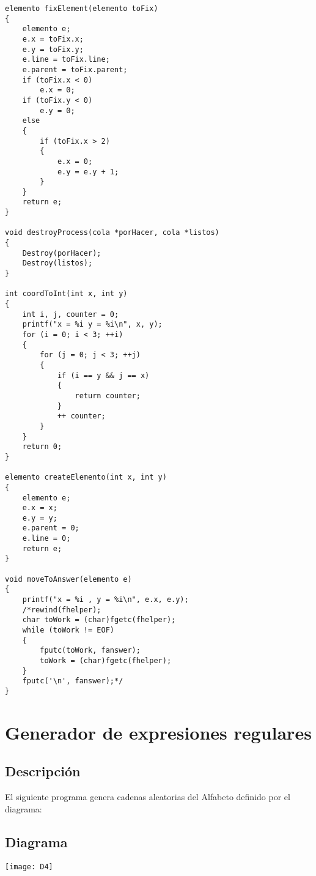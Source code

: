 \documentclass[11pt,a4paper]{report}
\begin{document}
\begin{lstlisting}
elemento fixElement(elemento toFix)
{
    elemento e;
    e.x = toFix.x;
    e.y = toFix.y;
    e.line = toFix.line;
    e.parent = toFix.parent;
    if (toFix.x < 0)
        e.x = 0;
    if (toFix.y < 0)
        e.y = 0;
    else
    {
        if (toFix.x > 2)
        {
            e.x = 0;
            e.y = e.y + 1;
        }
    }
    return e;
}

void destroyProcess(cola *porHacer, cola *listos)
{
    Destroy(porHacer);
    Destroy(listos);
}

int coordToInt(int x, int y)
{
    int i, j, counter = 0;
    printf("x = %i y = %i\n", x, y);
    for (i = 0; i < 3; ++i)
    {
        for (j = 0; j < 3; ++j)
        {
            if (i == y && j == x)
            {
                return counter;
            }
            ++ counter;
        }
    }
    return 0;
}

elemento createElemento(int x, int y)
{
    elemento e;
    e.x = x;
    e.y = y;
    e.parent = 0;
    e.line = 0;
    return e;
}

void moveToAnswer(elemento e)
{
    printf("x = %i , y = %i\n", e.x, e.y);
    /*rewind(fhelper);
    char toWork = (char)fgetc(fhelper);
    while (toWork != EOF)
    {
        fputc(toWork, fanswer);
        toWork = (char)fgetc(fhelper);
    }
    fputc('\n', fanswer);*/
}
	            \end{lstlisting}


	\chapter{Generador de expresiones regulares}
	 
	\section{Descripción}
		El siguiente programa genera cadenas aleatorias del Alfabeto definido por el diagrama:
		\section{Diagrama}
		\texttt{[image: D4]}

	
\end{document}
